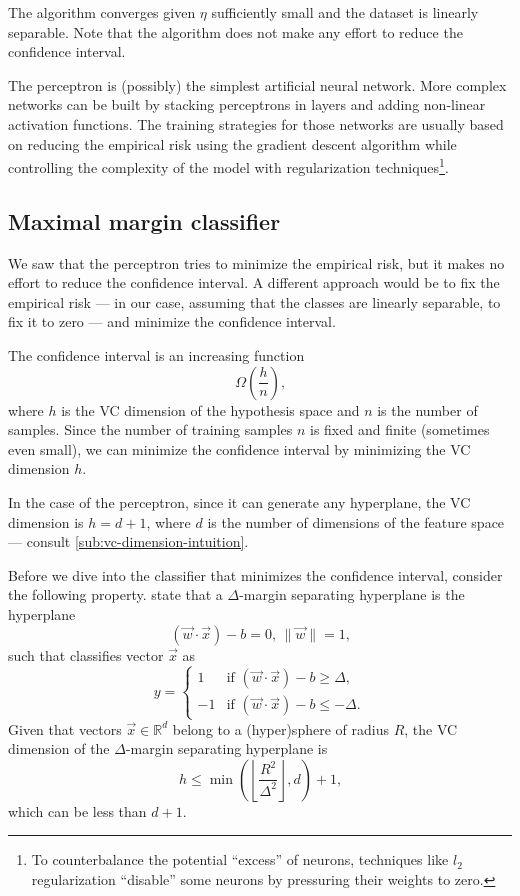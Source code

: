 The algorithm converges given $\eta$ sufficiently small and the dataset is linearly
separable.  Note that the algorithm does not make any effort to reduce the confidence
interval.

The perceptron is (possibly) the simplest artificial neural network.  More complex
networks can be built by stacking perceptrons in layers and adding non-linear activation
functions.  The training strategies for those networks are usually based on reducing the
empirical risk using the gradient descent algorithm while controlling the complexity of
the model with regularization techniques\footnote{To counterbalance the potential
``excess'' of neurons, techniques like $l_2$ regularization ``disable'' some neurons by
pressuring their weights to zero.}.


\subsection{Maximal margin classifier}

We saw that the perceptron tries to minimize the empirical risk, but it makes no effort to
reduce the confidence interval.  A different approach would be to fix the empirical risk
--- in our case, assuming that the classes are linearly separable, to fix it to zero --- and
minimize the confidence interval.

The confidence interval is an increasing function
\[
  \Omega\!\left(\frac{h}{n}\right)\text{,}
\]
where $h$ is the VC dimension of the hypothesis space and $n$ is the number of samples.
Since the number of training samples $n$ is fixed and finite (sometimes even small), we
can minimize the confidence interval by minimizing the VC dimension $h$.

In the case of the perceptron, since it can generate any hyperplane, the VC dimension is
$h = d + 1$, where $d$ is the number of dimensions of the feature space --- consult
\cref{sub:vc-dimension-intuition}.

Before we dive into the classifier that minimizes the confidence interval, consider the
following property.  \textcite{Vapnik1999b} state that a
$\Delta$-margin separating hyperplane is the hyperplane
\[
  (\vec{w} \cdot \vec{x}) - b = 0\text{, } \|\vec{w}\| = 1\text{,}
\]
such that classifies vector $\vec{x}$ as
\[
  y = \begin{cases}
    1 & \text{if } (\vec{w} \cdot \vec{x}) - b \geq \Delta\text{,} \\
    -1 & \text{if } (\vec{w} \cdot \vec{x}) - b \leq -\Delta\text{.}
  \end{cases}
\]
Given that vectors $\vec{x} \in \mathbb{R}^d$ belong to a (hyper)sphere of radius $R$, the
VC dimension of the $\Delta$-margin separating hyperplane is
\[
  h \leq \min\left(\left\lfloor \frac{R^2}{\Delta^2} \right\rfloor, d\right) + 1\text{,}
\]
which can be less than $d + 1$.

